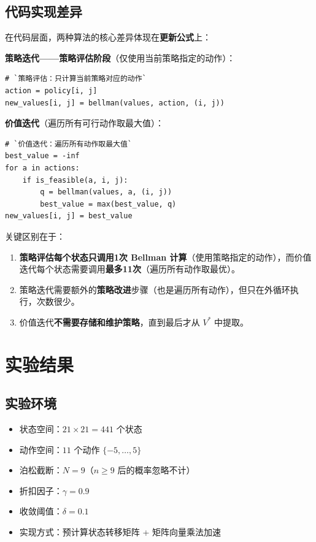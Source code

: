 \documentclass[12pt,a4paper]{ctexart}
\begin{document}
\subsection{代码实现差异}

在代码层面，两种算法的核心差异体现在\textbf{更新公式}上：

\textbf{策略迭代——策略评估阶段}（仅使用当前策略指定的动作）：
\begin{lstlisting}
# `策略评估：只计算当前策略对应的动作`
action = policy[i, j]
new_values[i, j] = bellman(values, action, (i, j))
\end{lstlisting}

\textbf{价值迭代}（遍历所有可行动作取最大值）：
\begin{lstlisting}
# `价值迭代：遍历所有动作取最大值`
best_value = -inf
for a in actions:
    if is_feasible(a, i, j):
        q = bellman(values, a, (i, j))
        best_value = max(best_value, q)
new_values[i, j] = best_value
\end{lstlisting}

关键区别在于：
\begin{enumerate}
  \item \textbf{策略评估每个状态只调用1次 Bellman 计算}（使用策略指定的动作），而价值迭代每个状态需要调用\textbf{最多11次}（遍历所有动作取最优）。
  \item 策略迭代需要额外的\textbf{策略改进}步骤（也是遍历所有动作），但只在外循环执行，次数很少。
  \item 价值迭代\textbf{不需要存储和维护策略}，直到最后才从 $V^*$ 中提取。
\end{enumerate}

\section{实验结果}

\subsection{实验环境}

\begin{itemize}[leftmargin=2em]
  \item 状态空间：$21 \times 21 = 441$ 个状态
  \item 动作空间：$11$ 个动作 $\{-5, \ldots, 5\}$
  \item 泊松截断：$N=9$（$n \geq 9$ 后的概率忽略不计）
  \item 折扣因子：$\gamma = 0.9$
  \item 收敛阈值：$\delta = 0.1$
  \item 实现方式：预计算状态转移矩阵 + 矩阵向量乘法加速
\end{itemize}
\end{document}
